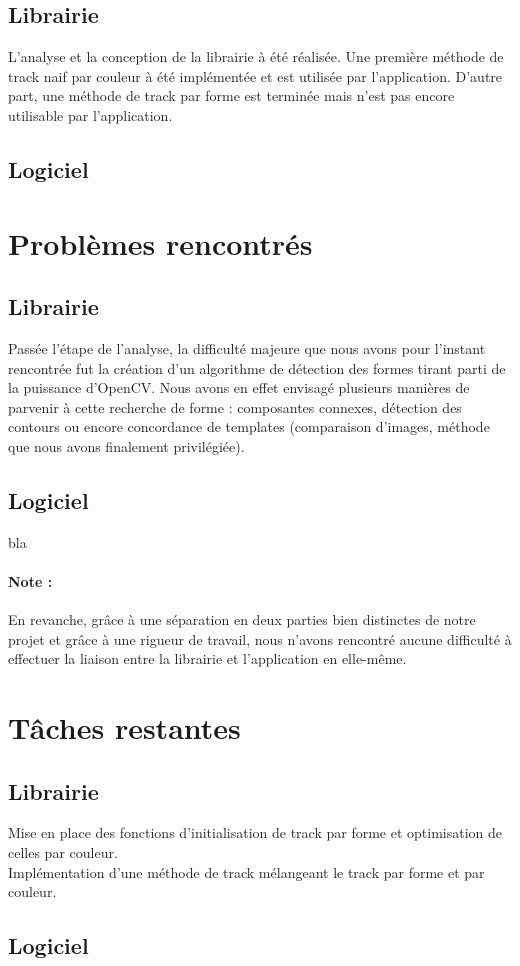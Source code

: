 \documentclass{article}
\begin{document}
		\subsection{Librairie}
			L'analyse et la conception de la librairie à été réalisée. Une première méthode de track naif par couleur à été implémentée et est utilisée par l'application. D'autre part, une méthode de track par forme est terminée mais n'est pas encore utilisable par l'application.
		\subsection{Logiciel}
	\section{Problèmes rencontrés}
		\subsection{Librairie}
			Passée l'étape de l'analyse, la difficulté majeure que nous avons pour l'instant rencontrée fut la création d'un algorithme de détection des formes tirant parti de la puissance d'OpenCV. Nous avons en effet envisagé plusieurs manières de parvenir à cette recherche de forme : composantes connexes, détection des contours ou encore concordance de templates (comparaison d'images, méthode que nous avons finalement privilégiée).
		\subsection{Logiciel}
			bla
			\paragraph{Note : \\}
				En revanche, grâce à une séparation en deux parties bien distinctes de notre projet et grâce à une rigueur de travail, nous n'avons rencontré aucune difficulté à effectuer la liaison entre la librairie et l'application en elle-même.
	\section{Tâches restantes}
		\subsection{Librairie}
			Mise en place des fonctions d'initialisation de track par forme et optimisation de celles par couleur.\\
			Implémentation d'une méthode de track mélangeant le track par forme et par couleur.\\
		\subsection{Logiciel}
\end{document}
